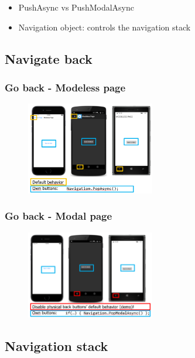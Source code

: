 \documentclass{article}
\begin{document}
\begin{itemize}
    \item PushAsync vs PushModalAsync
    \item Navigation object: controls the navigation stack
\end{itemize}

\subsection{Navigate back}

\subsubsection{Go back - Modeless page}

\begin{figure}[H]
    \centering
    \includegraphics[width=0.5\textwidth]{navigation-back-modeless.png}
    \caption{}
\end{figure}

\subsubsection{Go back - Modal page}

\begin{figure}[H]
    \centering
    \includegraphics[width=0.5\textwidth]{navigation-back-modal.png}
    \caption{}
\end{figure}

\subsection{Navigation stack}
\end{document}
